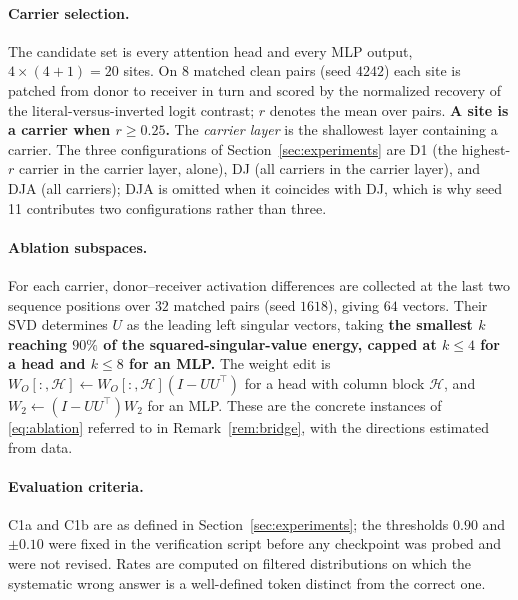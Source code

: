\documentclass[11pt,a4paper]{article}
\begin{document}
\paragraph{Carrier selection.} The candidate set is every attention head and
every MLP output, $4\times(4+1)=20$ sites. On $8$ matched clean pairs (seed
$4242$) each site is patched from donor to receiver in turn and scored by the
normalized recovery of the literal-versus-inverted logit contrast; $r$ denotes
the mean over pairs. \textbf{A site is a carrier when $r\ge0.25$.} The
\emph{carrier layer} is the shallowest layer containing a carrier. The three
configurations of Section~\ref{sec:experiments} are D1 (the highest-$r$
carrier in the carrier layer, alone), DJ (all carriers in the carrier layer),
and DJA (all carriers); DJA is omitted when it coincides with DJ, which is why
seed 11 contributes two configurations rather than three.

\paragraph{Ablation subspaces.} For each carrier, donor--receiver activation
differences are collected at the last two sequence positions over $32$ matched
pairs (seed $1618$), giving $64$ vectors. Their SVD determines
$U$ as the leading left singular vectors, taking \textbf{the smallest $k$
reaching $90\%$ of the squared-singular-value energy, capped at $k\le4$ for a
head and $k\le8$ for an MLP.} The weight edit is
$W_O[:,\mathcal H]\leftarrow W_O[:,\mathcal H](I-UU^\top)$ for a head with
column block $\mathcal H$, and $W_2\leftarrow(I-UU^\top)W_2$ for an MLP. These
are the concrete instances of \eqref{eq:ablation} referred to in
Remark~\ref{rem:bridge}, with the directions estimated from data.

\paragraph{Evaluation criteria.} C1a and C1b are as defined in
Section~\ref{sec:experiments}; the thresholds $0.90$ and $\pm0.10$ were fixed
in the verification script before any checkpoint was probed and were not
revised. Rates are computed on filtered distributions on which the systematic
wrong answer is a well-defined token distinct from the correct one.
\end{document}
